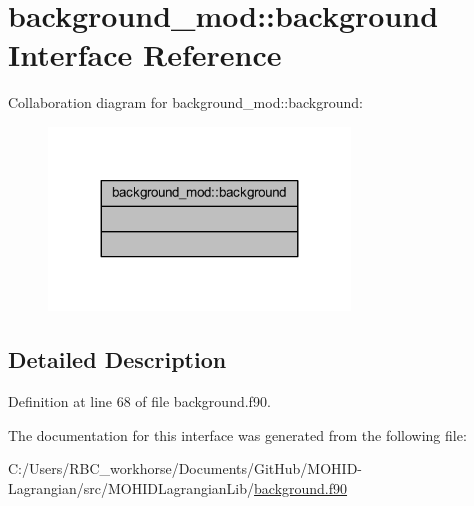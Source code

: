\hypertarget{interfacebackground__mod_1_1background}{}\section{background\+\_\+mod\+:\+:background Interface Reference}
\label{interfacebackground__mod_1_1background}


Collaboration diagram for background\+\_\+mod\+:\+:background\+:\nopagebreak
\begin{figure}[H]
\begin{center}
\leavevmode
\includegraphics[width=227pt]{interfacebackground__mod_1_1background__coll__graph}
\end{center}
\end{figure}


\subsection{Detailed Description}


Definition at line 68 of file background.\+f90.



The documentation for this interface was generated from the following file\+:\begin{DoxyCompactItemize}
\item 
C\+:/\+Users/\+R\+B\+C\+\_\+workhorse/\+Documents/\+Git\+Hub/\+M\+O\+H\+I\+D-\/\+Lagrangian/src/\+M\+O\+H\+I\+D\+Lagrangian\+Lib/\mbox{\hyperlink{background_8f90}{background.\+f90}}\end{DoxyCompactItemize}

